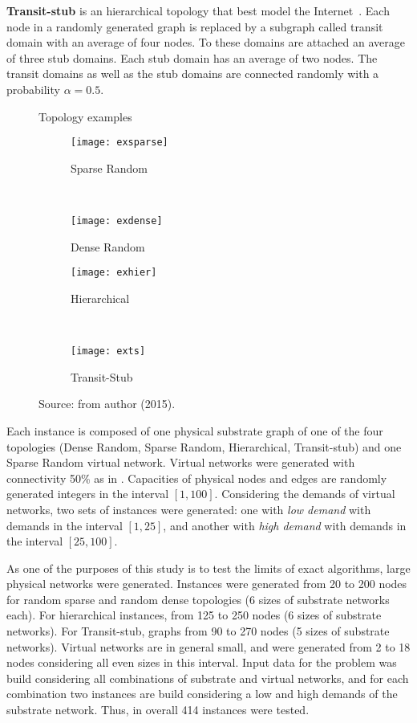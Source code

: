\textbf{Transit-stub} is an hierarchical topology that best model the Internet~\cite{Zagura:1996}. Each node in a randomly generated graph is replaced by a subgraph called transit domain with an average of four nodes. To these domains are attached an average of three stub domains. Each stub domain has an average of two nodes. The transit domains as well as the stub domains are connected randomly with a probability $\alpha = 0.5$.

\begin{figure}
        \centering
        \caption{Topology examples}\label{fig:topo}
        \begin{subfigure}[b]{0.45\textwidth}
                \caption{Sparse Random}
                \texttt{[image: exsparse]}
                \label{fig:gensparse}
        \end{subfigure}%
        ~ 
        \begin{subfigure}[b]{0.45\textwidth}
                \caption{Dense Random}
                \texttt{[image: exdense]}
                \label{fig:gendense}
        \end{subfigure}

        \begin{subfigure}[b]{0.45\textwidth}
                \caption{Hierarchical}
                \texttt{[image: exhier]}
                \label{fig:genhier}
        \end{subfigure}
        ~ 
        \begin{subfigure}[b]{0.45\textwidth}
                \caption{Transit-Stub}
                \texttt{[image: exts]}
                \label{fig:gents}
        \end{subfigure}
\caption*{Source: from author (2015).}\end{figure}

Each instance is composed of one physical substrate graph of one of the four topologies (Dense Random, Sparse Random, Hierarchical, Transit-stub) and one Sparse Random virtual network.  Virtual networks were generated with connectivity 50\% as in \cite{Chowdhury:2012}. Capacities of physical nodes and edges are randomly generated integers in the interval $[1,100]$. Considering the demands of virtual networks, two sets of instances were generated: one with \emph{low demand} with demands in the interval $[1,25]$, and another with \emph{high demand} with demands in the interval $[25,100]$.

As one of the purposes of this study is to test the limits of exact algorithms, large physical networks were generated.
Instances were generated from 20 to 200 nodes for random sparse and random dense topologies (6 sizes of substrate networks each).
For hierarchical instances, from 125 to 250 nodes (6 sizes of substrate networks). 
For Transit-stub, graphs from 90 to 270 nodes (5 sizes of substrate networks).
Virtual networks are in general small, and were generated from 2 to 18 nodes considering all even sizes in this interval.
Input data for the problem was build considering all combinations of substrate and virtual networks, and for each combination two instances are build considering a low and high demands of the substrate network.
Thus, in overall 414 instances were tested.


